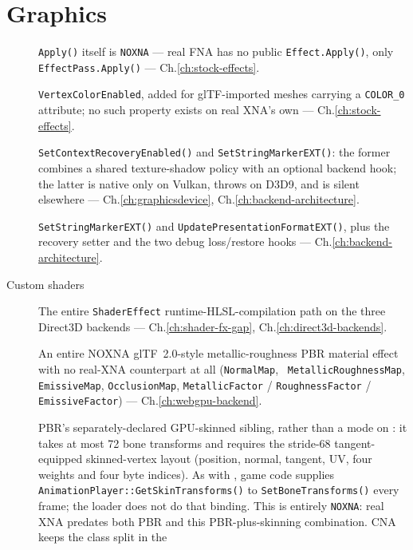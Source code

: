 \section{Graphics}

\begin{description}
\item[] \texttt{Apply()} itself is \texttt{NOXNA} --- real FNA has no public
  \texttt{Effect.Apply()}, only \texttt{EffectPass.Apply()} --- Ch.\ref{ch:stock-effects}.
\item[] \texttt{VertexColorEnabled}, added for glTF-imported meshes
  carrying a \texttt{COLOR\_0} attribute; no such property exists on real XNA's own
   --- Ch.\ref{ch:stock-effects}.
\item[] \texttt{SetContextRecoveryEnabled()} and
  \texttt{SetStringMarkerEXT()}: the former combines a shared texture-shadow policy with an
  optional backend hook; the latter is native only on Vulkan, throws on D3D9, and is silent
  elsewhere --- Ch.\ref{ch:graphicsdevice}, Ch.\ref{ch:backend-architecture}.
\item[]
  \texttt{SetStringMarkerEXT()} and \texttt{UpdatePresentationFormatEXT()}, plus the recovery
  setter and the two debug loss/restore hooks --- Ch.\ref{ch:backend-architecture}.
\item[Custom shaders] The entire \texttt{ShaderEffect} runtime-HLSL-compilation path on the
  three Direct3D backends --- Ch.\ref{ch:shader-fx-gap}, Ch.\ref{ch:direct3d-backends}.
\item[] An entire NOXNA glTF~2.0-style metallic-roughness PBR material
  effect with no real-XNA counterpart at all (\texttt{NormalMap}, \texttt{%
  MetallicRoughnessMap}, \texttt{EmissiveMap}, \texttt{OcclusionMap},
  \texttt{MetallicFactor} / \texttt{RoughnessFactor} / \texttt{EmissiveFactor}) --- Ch.\ref{ch:webgpu-backend}.
\item[] PBR's separately-declared GPU-skinned sibling, rather
  than a mode on : it takes at most 72 bone transforms and requires the
  stride-68 tangent-equipped skinned-vertex layout (position, normal, tangent, UV, four weights
  and four byte indices). As with , game
  code supplies \texttt{AnimationPlayer::GetSkinTransforms()} to \texttt{SetBoneTransforms()}
  every frame; the loader does not do that binding. This is entirely \texttt{NOXNA}: real XNA
  predates both PBR and this PBR-plus-skinning combination. CNA keeps the class split in the

\end{description}
